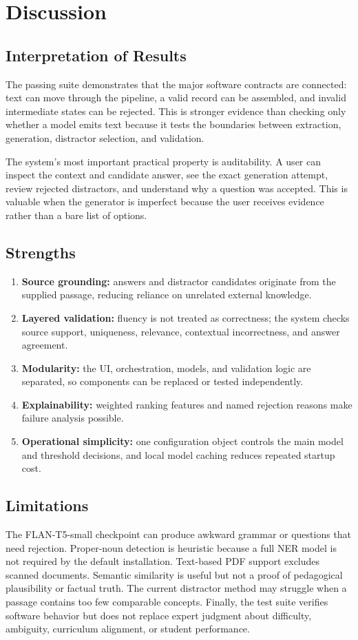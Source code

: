 \documentclass[12pt,a4paper]{report}
\newcommand{\term}[1]{\textbf{#1}}
\begin{document}
\clearpage
\chapter{Discussion}
\section{Interpretation of Results}
The passing suite demonstrates that the major software contracts are connected: text can move through the pipeline, a valid record can be assembled, and invalid intermediate states can be rejected. This is stronger evidence than checking only whether a model emits text because it tests the boundaries between extraction, generation, distractor selection, and validation.

The system's most important practical property is auditability. A user can inspect the context and candidate answer, see the exact generation attempt, review rejected distractors, and understand why a question was accepted. This is valuable when the generator is imperfect because the user receives evidence rather than a bare list of options.

\section{Strengths}
\begin{enumerate}
\item \term{Source grounding:} answers and distractor candidates originate from the supplied passage, reducing reliance on unrelated external knowledge.
\item \term{Layered validation:} fluency is not treated as correctness; the system checks source support, uniqueness, relevance, contextual incorrectness, and answer agreement.
\item \term{Modularity:} the UI, orchestration, models, and validation logic are separated, so components can be replaced or tested independently.
\item \term{Explainability:} weighted ranking features and named rejection reasons make failure analysis possible.
\item \term{Operational simplicity:} one configuration object controls the main model and threshold decisions, and local model caching reduces repeated startup cost.
\end{enumerate}

\section{Limitations}
The FLAN-T5-small checkpoint can produce awkward grammar or questions that need rejection. Proper-noun detection is heuristic because a full NER model is not required by the default installation. Text-based PDF support excludes scanned documents. Semantic similarity is useful but not a proof of pedagogical plausibility or factual truth. The current distractor method may struggle when a passage contains too few comparable concepts. Finally, the test suite verifies software behavior but does not replace expert judgment about difficulty, ambiguity, curriculum alignment, or student performance.
\end{document}
